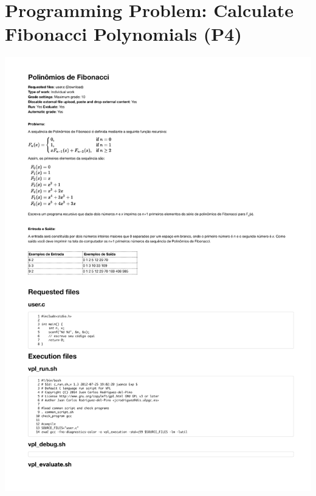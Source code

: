 \section{Programming Problem: Calculate Fibonacci Polynomials (P4)}
\label{annex:third-study-p4}
\includegraphics[page=1,width=1\textwidth]{images/annex/third-study-p4.pdf}

\newpage
